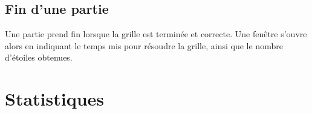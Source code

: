\documentclass[a4paper, 12pt]{report}
\begin{document}

        \subsection{Fin d'une partie}
        
            Une partie prend fin lorsque la grille est terminée et correcte. Une fenêtre s'ouvre alors en indiquant le temps mis pour résoudre la grille, ainsi que le nombre d'étoiles obtenues.
 
            
	
	\section{Statistiques}

		

		
		
		
\end{document}
